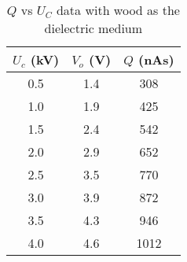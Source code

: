 \begin{table}[H]
    \centering
    \begin{tabular}{|c|c|c|}
    \hline
        $U_c$ (kV)& $V_o$ (V) & $Q$ (nAs) \\ \hline
        0.5 & 1.4     &  308     \\
    1.0 & 1.9 &  425 \\
    1.5 & 2.4 &  542\\
    2.0 & 2.9 &  652 \\
    2.5 & 3.5     &  770     \\
    3.0 & 3.9 &  872 \\
    3.5 & 4.3     &  946     \\
    4.0 & 4.6     & 1012     \\
    \hline
    \end{tabular}
    \caption{$Q$ vs $U_C$ data with wood as the dielectric medium}
    \label{tab:4}
\end{table}